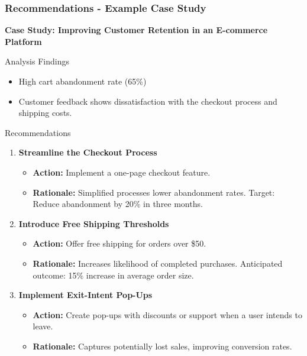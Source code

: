 \documentclass[aspectratio=169]{beamer}
\begin{document}
\begin{frame}[fragile]
    \frametitle{Recommendations - Example Case Study}
    \textbf{Case Study: Improving Customer Retention in an E-commerce Platform}
   
    \begin{block}{Analysis Findings}
        \begin{itemize}
            \item High cart abandonment rate (65\%)
            \item Customer feedback shows dissatisfaction with the checkout process and shipping costs.
        \end{itemize}
    \end{block}

    \begin{block}{Recommendations}
        \begin{enumerate}
            \item \textbf{Streamline the Checkout Process} 
                \begin{itemize}
                    \item \textbf{Action:} Implement a one-page checkout feature.
                    \item \textbf{Rationale:} Simplified processes lower abandonment rates. Target: Reduce abandonment by 20\% in three months.
                \end{itemize}
            \item \textbf{Introduce Free Shipping Thresholds} 
                \begin{itemize}
                    \item \textbf{Action:} Offer free shipping for orders over \$50.
                    \item \textbf{Rationale:} Increases likelihood of completed purchases. Anticipated outcome: 15\% increase in average order size.
                \end{itemize}
            \item \textbf{Implement Exit-Intent Pop-Ups} 
                \begin{itemize}
                    \item \textbf{Action:} Create pop-ups with discounts or support when a user intends to leave.
                    \item \textbf{Rationale:} Captures potentially lost sales, improving conversion rates.
                \end{itemize}
        \end{enumerate}
    \end{block}
\end{frame}
\end{document}
